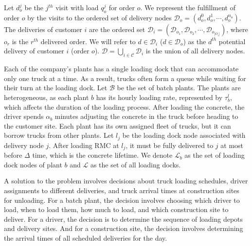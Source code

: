 \documentclass{article}
\begin{document}
Let $d^j_{o}$ be the $j^{th}$ visit with load $q^j_{o}$ for order $o$. We represent the fulfillment of order $o$ by the visits to the ordered set of delivery nodes $\mathcal{D}_o= \left(d^0_{o},d^1_{o},\cdots, d^{n_o}_{o}\right)$. The deliveries of customer $i$ are the ordered set $\mathcal{D}_i= (\mathcal{D}_{o_1}, \mathcal{D}_{o_2},\cdots,\mathcal{D}_{o_{|O_i|}})$, where $o_r$ is the $r^{th}$ delivered order. We will refer to $d \in \mathcal{D}_i$ ($d \in \mathcal{D}_o$) as the $d^{th}$ potential delivery of customer $i$ (order $o$). $\mathcal{D}=\bigcup_{i\in \mathcal{C}} \mathcal{D}_i$ is the union of all delivery nodes.


Each of the company's plants has a single loading dock that can accommodate only one truck at a time. As a result, trucks often form a queue while waiting for their turn at the loading dock. Let $\mathcal{B}$ be the set of batch plants. The plants are heterogeneous, as each plant $b$ has its hourly loading rate, represented by $\tau^l_b$, which affects the duration of the loading process. After loading the concrete, the driver spends $\alpha_b$ minutes adjusting the concrete in the truck before heading to the customer site. Each plant has its own assigned fleet of trucks, but it can borrow trucks from other plants. Let $l_{j}$ be the loading dock node associated with delivery node $j$. After loading RMC at $l_j$, it must be fully delivered to $j$ at most before $\Delta$ time, which is the concrete lifetime. We denote $\mathcal{L}_b$ as the set of loading dock nodes of plant $b$ and $\mathcal{L}$ as the set of all loading docks.

A solution to the problem involves decisions about truck loading schedules, driver assignments to different deliveries, and truck arrival times at construction sites for unloading. For a batch plant, the decision involves choosing which driver to load, when to load them, how much to load, and which construction site to deliver. For a driver, the decision is to determine the sequence of loading depots and delivery sites. And for a construction site, the decision involves determining the arrival times of all scheduled deliveries for the day.
\end{document}
